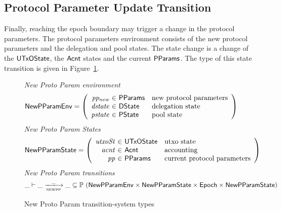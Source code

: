 \clearpage

\subsection{Protocol Parameter Update Transition}
\label{sec:pparam-update}

Finally, reaching the epoch boundary may trigger a change in the protocol
parameters. The protocol parameters environment consists of the new
protocol parameters and the delegation and pool states.
The state change is a change of the $\mathsf{UTxOState}$, the $\mathsf{Acnt}$ states and the current $\mathsf{PParams}$.
The type of this state transition is given in Figure~\ref{fig:ts-types:new-proto-param}.

\begin{figure}[htb]
  \emph{New Proto Param environment}
  \begin{equation*}
    \NewPParamEnv =
    \left(
      \begin{array}{r@{~\in~}ll}
        \var{pp_{new}} & \PParams & \text{new protocol parameters}\\
        \var{dstate} & \DState & \text{delegation state}\\
        \var{pstate} & \PState & \text{pool state}\\
      \end{array}
    \right)
  \end{equation*}
  \emph{New Proto Param States}
  \begin{equation*}
    \NewPParamState =
    \left(
      \begin{array}{r@{~\in~}ll}
        \var{utxoSt} & \UTxOState & \text{utxo state}\\
        \var{acnt} & \Acnt & \text{accounting}\\
        \var{pp} & \PParams & \text{current protocol parameters}\\
      \end{array}
    \right)
  \end{equation*}
  \emph{New Proto Param transitions}
  \begin{equation*}
    \_ \vdash
    \var{\_} \trans{newpp}{\_} \var{\_}
    \subseteq \powerset (\NewPParamEnv \times \NewPParamState \times \Epoch \times \NewPParamState)
  \end{equation*}
  \caption{New Proto Param transition-system types}
  \label{fig:ts-types:new-proto-param}
\end{figure}


